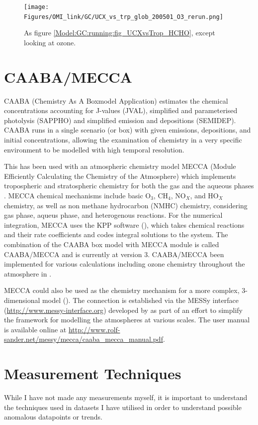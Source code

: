       \begin{figure}%
        \texttt{[image: Figures/OMI\_link/GC/UCX\_vs\_trp\_glob\_200501\_O3\_rerun.png]}
        \caption{%
          As figure \ref{Model:GC:running:fig_UCXvsTrop_HCHO}, except looking at ozone. 
        }
        \label{Model:GC:running:fig_UCXvsTrop_O3}
      \end{figure}

\section{CAABA/MECCA}
\label{Model:CM}
  
  CAABA (Chemistry As A Boxmodel Application) estimates the chemical concentrations accounting for J-values (JVAL), simplified and parameterised photolysis (SAPPHO) and simplified emission and depositions (SEMIDEP).
  CAABA runs in a single scenario (or box) with given emissions, depositions, and initial concentrations, allowing the examination of chemistry in a very specific environment to be modelled with high temporal resolution.
  
  This has been used with an atmospheric chemistry model MECCA (Module Efficiently Calculating the Chemistry of the Atmosphere) which implements tropospheric and stratospheric chemistry for both the gas and the aqueous phases \citep{Sander2005}.
  MECCA chemical mechanisms include basic O$_3$, CH$_4$, NO$_X$, and HO$_X$ chemistry, as well as non methane hydrocarbon (NMHC) chemistry, considering gas phase, aqueus phase, and heterogenous reactions. \citep{Sander2005}
  For the numerical integration, MECCA uses the KPP software (\cite{SanduSander2006}), which takes chemical reactions and their rate coefficients and codes integral solutions to the system.
  The combination of the CAABA box model with MECCA module is called CAABA/MECCA and is currently at version 3.
  CAABA/MECCA been implemented for various calculations including ozone chemistry throughout the atmosphere in \cite{Zanis2014}.
  
  MECCA could also be used as the chemistry mechanism for a more complex, 3-dimensional model (\cite[e.g.][]{Jockel2006}).
  The connection is established via the MESSy interface (\url{http://www.messy-interface.org}) developed by \cite{Jockel2005} as part of an effort to simplify the framework for modelling the atmospheres at various scales.
  The user manual is available online at \url{http://www.rolf-sander.net/messy/mecca/caaba_mecca_manual.pdf}.


\section{Measurement Techniques}
  \label{Model:Meas}
  While I have not made any measurements myself, it is important to understand the techniques used in datasets I have utilised in order to understand possible anomalous datapoints or trends.
  
